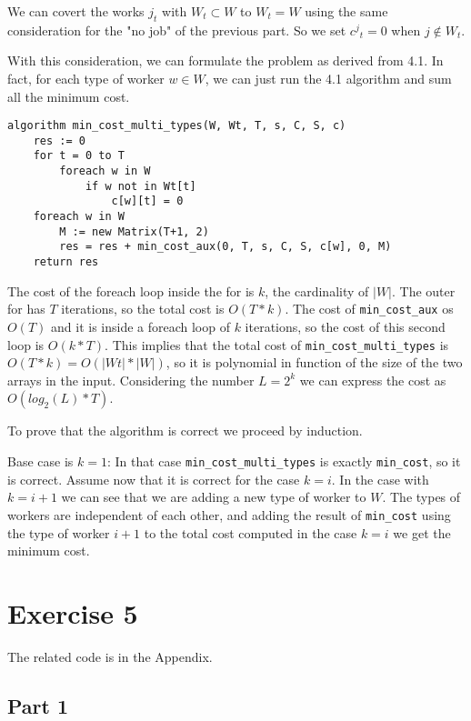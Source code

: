 \documentclass[paper=a4, fontsize=11pt]{scrartcl} %
\numberwithin{equation}{section} %
\numberwithin{figure}{section} %
\numberwithin{table}{section} %
\begin{document}
We can covert the works $j_t$ with $W_t \subset W$ to $W_t = W$ using the same consideration for the "no job" of the previous part.
So we set ${c^j}_t = 0$ when $j \notin W_t$.

With this consideration, we can formulate the problem as derived from 4.1.
In fact, for each type of worker $w \in W$, we can just run the 4.1 algorithm and sum all the minimum cost.

\begin{verbatim}
algorithm min_cost_multi_types(W, Wt, T, s, C, S, c)
    res := 0
    for t = 0 to T
        foreach w in W
            if w not in Wt[t]
                c[w][t] = 0
    foreach w in W
        M := new Matrix(T+1, 2)
        res = res + min_cost_aux(0, T, s, C, S, c[w], 0, M)
    return res
\end{verbatim}

The cost of the foreach loop inside the for is $k$, the cardinality of $|W|$.
The outer for has $T$ iterations, so the total cost is $O(T*k)$.
The cost of \verb|min_cost_aux| os $O(T)$ and it is inside a foreach loop of $k$ iterations, so the cost of this second loop is $O(k*T)$.
This implies that the total cost of \verb|min_cost_multi_types| is $O(T*k) = O(|Wt|*|W|)$, so it is polynomial in function of the size of the two arrays in the input.
Considering the number $L = 2^k$ we can express the cost as $O(log_2(L)*T)$.

To prove that the algorithm is correct we proceed by induction.

Base case is $k=1$: In that case \verb|min_cost_multi_types| is exactly \verb|min_cost|, so it is correct.
Assume now that it is correct for the case $k = i$.
In the case with $k = i+1$ we can see that we are adding a new type of worker to $W$.
The types of workers are independent of each other, and adding the result of \verb|min_cost| using the type of worker $i+1$ to the total cost computed in the case $k=i$ we get the minimum cost.



\newpage
\section*{Exercise 5}

The related code is in the Appendix.

\subsection*{Part 1}
\end{document}
